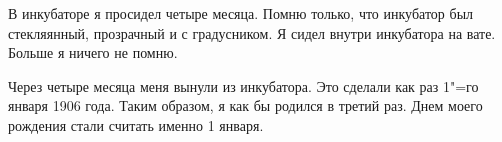 В  инкубаторе я  просидел четыре  месяца. Помню только, что инкубатор  был стекляянный,  прозрачный и с градусником.  Я сидел
внутри  инкубатора на вате.  Больше я ничего
не помню.

     Через четыре  месяца меня вынули из инкубатора.  Это сделали  как раз  1"=го января
1906 года. Таким образом, я как бы родился в
третий раз.  Днем  моего рождения стали считать именно 1 января.
